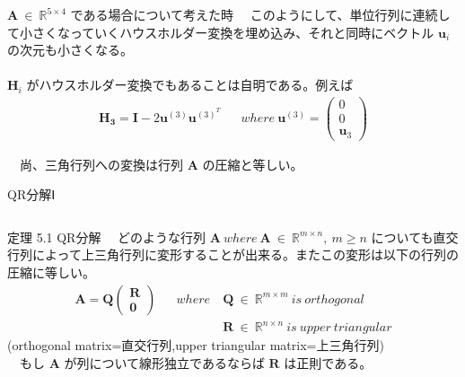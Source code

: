 \documentclass[dvipdfmx,10pt,presentation]{beamer}
\begin{document}
\begin{frame}[allowframebreaks]{\(\bm{A}\ \in\ \mathbb{R}^{5\times4}\) である場合について考えた時}
　このようにして、単位行列に連続して小さくなっていくハウスホルダー変換を埋め込み、それと同時にベクトル \(\bm{u}_i\) の次元も小さくなる。\\
　\\
\(\bm{H}_i\) がハウスホルダー変換でもあることは自明である。例えば\\

\begin{align*}
\bm{H_3} = \bm{I} - 2 \bm{u}^{(3)} \bm{u}^{(3)^T} 
&&  where\ \bm{u}^{(3)}=
\begin{pmatrix}
0 \\
0 \\
\bm{u}_3
\end{pmatrix}
\end{align*}

　尚、三角行列への変換は行列 \(\bm{A}\) の圧縮と等しい。\\
\end{frame}
\begin{frame}[label={sec:org29e3856}]{QR分解Ⅰ}
\begin{columns}
\begin{column}{1.00\columnwidth}
\begin{block}{定理 5.1 QR分解}
　どのような行列 \(\bm{A}\ where\ \bm{A}\ \in\ \mathbb{R}^{m\times n},\ m \geq n\) についても直交行列によって上三角行列に変形することが出来る。またこの変形は以下の行列の圧縮に等しい。\\

\begin{align*}
\bm{A} = \bm{Q}
\begin{pmatrix}
\bm{R}\\
\bm{0}
\end{pmatrix}&& where\ &\bm{Q}\ \in\ \mathbb{R}^{m\times m}\ is\ orthogonal \\
             &&& \bm{R}\ \in\ \mathbb{R}^{n\times n}\ is\ upper\ triangular
\end{align*}
(orthogonal matrix=直交行列,upper triangular matrix=上三角行列)\\
　もし \(\bm{A}\) が列について線形独立であるならば \(\bm{R}\) は正則である。\\
\end{block}
\end{column}
\end{columns}
\end{frame}
\end{document}
